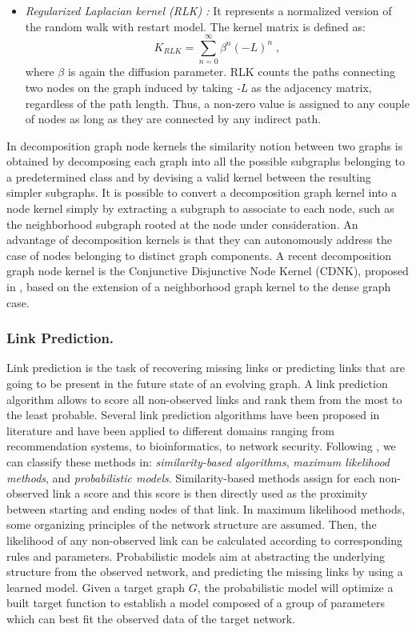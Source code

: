\begin{itemize}
\item \textit{Regularized Laplacian kernel (RLK) \cite{proceeding4}:} It represents a normalized version of the random walk with restart model. The kernel matrix is defined as:
\begin{equation}
K_{RLK} = \sum_{n=0}^{\infty}\beta^{n}(-L)^n\; ,
\end{equation}
where $\beta$ is again the diffusion parameter. RLK counts the paths connecting two nodes on the graph induced by taking \textit{-L} as the adjacency matrix, regardless of the path length. Thus, a non-zero value is assigned to any couple of nodes as long as they are connected by any indirect path.
\end{itemize}

In decomposition graph node kernels \cite{proceeding5} the similarity notion
between two graphs is obtained by decomposing each graph into all the possible
subgraphs belonging to a predetermined class and by devising a valid kernel
between the resulting simpler subgraphs. It is possible to convert a
decomposition graph kernel into a node kernel simply by extracting a subgraph
to associate to each node, such as the neighborhood subgraph rooted at the
node under consideration. An advantage of decomposition kernels is that they
can autonomously address the case of nodes belonging to distinct graph
components. A recent decomposition graph node kernel is the Conjunctive 
Disjunctive Node Kernel (CDNK), proposed in \cite{proceeding6}, based on the
extension of a neighborhood graph kernel to the dense graph case.



\subsubsection{Link Prediction.}
\label{link-prediction}

Link prediction is the task of recovering missing links or predicting links
that are going to be present in the future state of an evolving graph. A link
prediction algorithm  allows to score all non-observed links and rank them
from the most  to the least probable.  Several link prediction algorithms have been
proposed in literature and have been applied to different domains ranging from
recommendation systems, to bioinformatics, to network security. 
Following \cite{jour2}, we can classify these methods in:
\textit{similarity-based algorithms}, \textit{maximum likelihood methods}, and
\textit{probabilistic models}. Similarity-based methods assign for each non-
observed link a score and this score is then directly used as the proximity
between starting and ending nodes of that link. In maximum likelihood methods,
some organizing principles of the network structure are assumed. Then, the
likelihood of any non-observed link can be calculated according to
corresponding rules and parameters. Probabilistic models aim at abstracting
the underlying structure from the observed network, and predicting the missing
links by using a learned model. Given a target graph $G$, the probabilistic
model will optimize a built target function to establish a model composed of a
group of parameters which can best fit the observed data of the target
network.

